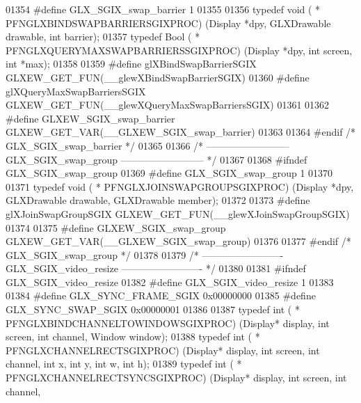 \begin{DoxyCode}
01354 \textcolor{preprocessor}{#define GLX\_SGIX\_swap\_barrier 1}
01355 
01356 \textcolor{keyword}{typedef} void ( * PFNGLXBINDSWAPBARRIERSGIXPROC) (Display *dpy, GLXDrawable drawable, \textcolor{keywordtype}{int} 
      barrier);
01357 \textcolor{keyword}{typedef} Bool ( * PFNGLXQUERYMAXSWAPBARRIERSSGIXPROC) (Display *dpy, \textcolor{keywordtype}{int} screen, \textcolor{keywordtype}{int} *max);
01358 
01359 \textcolor{preprocessor}{#define glXBindSwapBarrierSGIX GLXEW\_GET\_FUN(\_\_glewXBindSwapBarrierSGIX)}
01360 \textcolor{preprocessor}{#define glXQueryMaxSwapBarriersSGIX GLXEW\_GET\_FUN(\_\_glewXQueryMaxSwapBarriersSGIX)}
01361 
01362 \textcolor{preprocessor}{#define GLXEW\_SGIX\_swap\_barrier GLXEW\_GET\_VAR(\_\_GLXEW\_SGIX\_swap\_barrier)}
01363 
01364 \textcolor{preprocessor}{#endif }\textcolor{comment}{/* GLX\_SGIX\_swap\_barrier */}\textcolor{preprocessor}{}
01365 
01366 \textcolor{comment}{/* -------------------------- GLX\_SGIX\_swap\_group -------------------------- */}
01367 
01368 \textcolor{preprocessor}{#ifndef GLX\_SGIX\_swap\_group}
01369 \textcolor{preprocessor}{#define GLX\_SGIX\_swap\_group 1}
01370 
01371 \textcolor{keyword}{typedef} void ( * PFNGLXJOINSWAPGROUPSGIXPROC) (Display *dpy, GLXDrawable drawable, GLXDrawable member);
01372 
01373 \textcolor{preprocessor}{#define glXJoinSwapGroupSGIX GLXEW\_GET\_FUN(\_\_glewXJoinSwapGroupSGIX)}
01374 
01375 \textcolor{preprocessor}{#define GLXEW\_SGIX\_swap\_group GLXEW\_GET\_VAR(\_\_GLXEW\_SGIX\_swap\_group)}
01376 
01377 \textcolor{preprocessor}{#endif }\textcolor{comment}{/* GLX\_SGIX\_swap\_group */}\textcolor{preprocessor}{}
01378 
01379 \textcolor{comment}{/* ------------------------- GLX\_SGIX\_video\_resize ------------------------- */}
01380 
01381 \textcolor{preprocessor}{#ifndef GLX\_SGIX\_video\_resize}
01382 \textcolor{preprocessor}{#define GLX\_SGIX\_video\_resize 1}
01383 
01384 \textcolor{preprocessor}{#define GLX\_SYNC\_FRAME\_SGIX 0x00000000}
01385 \textcolor{preprocessor}{#define GLX\_SYNC\_SWAP\_SGIX 0x00000001}
01386 
01387 \textcolor{keyword}{typedef} int ( * PFNGLXBINDCHANNELTOWINDOWSGIXPROC) (Display* display, \textcolor{keywordtype}{int} screen, \textcolor{keywordtype}{int} channel, Window 
      window);
01388 \textcolor{keyword}{typedef} int ( * PFNGLXCHANNELRECTSGIXPROC) (Display* display, \textcolor{keywordtype}{int} screen, \textcolor{keywordtype}{int} channel, \textcolor{keywordtype}{int} 
      x, \textcolor{keywordtype}{int} y, \textcolor{keywordtype}{int} w, \textcolor{keywordtype}{int} h);
01389 \textcolor{keyword}{typedef} int ( * PFNGLXCHANNELRECTSYNCSGIXPROC) (Display* display, \textcolor{keywordtype}{int} screen, \textcolor{keywordtype}{int} channel, 

\end{DoxyCode}
